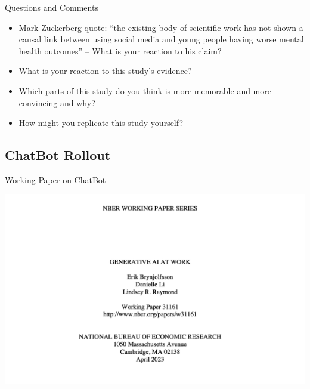 \documentclass{beamer}
\begin{document}
\begin{frame}{Questions and Comments}

\begin{itemize}
\item Mark Zuckerberg quote: ``the existing body of scientific work has not shown a causal link between using social media and young people having worse mental health outcomes'' -- What is your reaction to his claim?
\item What is your reaction to this study's evidence?  
\item Which parts of this study do you think is more memorable and more convincing and why?
\item How might you replicate this study yourself?

\end{itemize}

\end{frame}


\subsection{ChatBot Rollout}

\begin{frame}{Working Paper on ChatBot}
\begin{center}
\includegraphics[scale=0.35]{./lecture_includes/brynn}
\end{center}
\end{frame}
\end{document}
